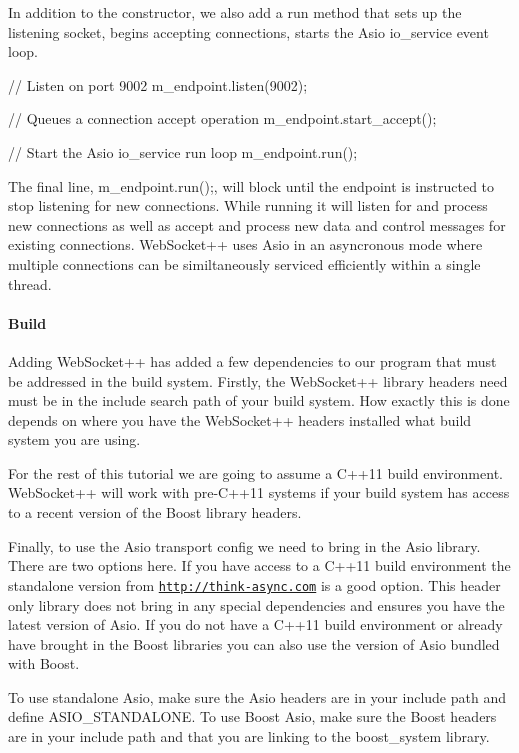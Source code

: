 In addition to the constructor, we also add a run method that sets up the listening socket, begins accepting connections, starts the Asio io\+\_\+service event loop.


\begin{DoxyCode}
\textcolor{comment}{// Listen on port 9002}
m\_endpoint.listen(9002);

\textcolor{comment}{// Queues a connection accept operation}
m\_endpoint.start\_accept();

\textcolor{comment}{// Start the Asio io\_service run loop}
m\_endpoint.run();
\end{DoxyCode}


The final line, {\ttfamily m\+\_\+endpoint.\+run();}, will block until the endpoint is instructed to stop listening for new connections. While running it will listen for and process new connections as well as accept and process new data and control messages for existing connections. Web\+Socket++ uses Asio in an asyncronous mode where multiple connections can be similtaneously serviced efficiently within a single thread.

\paragraph*{Build}

Adding Web\+Socket++ has added a few dependencies to our program that must be addressed in the build system. Firstly, the Web\+Socket++ library headers need must be in the include search path of your build system. How exactly this is done depends on where you have the Web\+Socket++ headers installed what build system you are using.

For the rest of this tutorial we are going to assume a C++11 build environment. Web\+Socket++ will work with pre-\/\+C++11 systems if your build system has access to a recent version of the Boost library headers.

Finally, to use the Asio transport config we need to bring in the Asio library. There are two options here. If you have access to a C++11 build environment the standalone version from \href{http://think-async.com}{\tt http\+://think-\/async.\+com} is a good option. This header only library does not bring in any special dependencies and ensures you have the latest version of Asio. If you do not have a C++11 build environment or already have brought in the Boost libraries you can also use the version of Asio bundled with Boost.

To use standalone Asio, make sure the Asio headers are in your include path and define A\+S\+I\+O\+\_\+\+S\+T\+A\+N\+D\+A\+L\+O\+NE. To use Boost Asio, make sure the Boost headers are in your include path and that you are linking to the boost\+\_\+system library.

